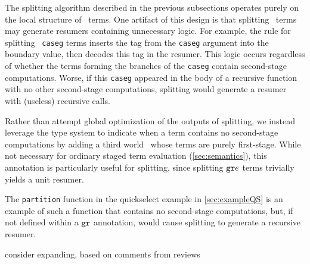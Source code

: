\begin{abstrsyn}
The splitting algorithm described in the previous subsections operates
purely on the local structure of \lang\ terms.  One artifact of this design
is that splitting \bbonem\ terms may generate resumers containing
unnecessary logic.  For example, the rule for splitting
\bbonem\ \texttt{caseg} terms inserts the tag from the \texttt{caseg}
argument into the boundary value, then decodes this tag in the
resumer. This logic occurs regardless of whether the terms forming the
branches of the \texttt{caseg} contain second-stage computations.
Worse, if this \texttt{caseg} appeared in the body of a recursive
function with no other second-stage computations, splitting would
generate a resumer with (useless) recursive calls.

Rather than attempt global optimization of the outputs of splitting,
we instead leverage the type system to indicate when a term contains
no second-stage computations by adding a third world \bbonep\ whose
terms are purely first-stage.  While not necessary for ordinary staged
term evaluation (\ref{sec:semantics}), this annotation is
particularly useful for splitting, since splitting ${\tt gr} e$
terms trivially yields a unit resumer.

The \texttt{partition} function in the quickselect example in
\ref{sec:exampleQS} is an example of such a function that contains no
second-stage computations, but, if not defined within a ${\tt gr}$
annotation, would cause splitting to generate a recursive resumer.

\TODO consider expanding, based on comments from reviews

\end{abstrsyn}


